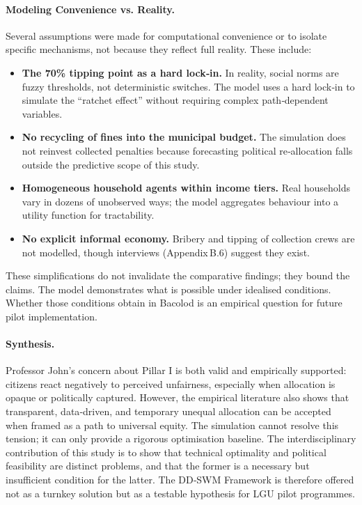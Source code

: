 \paragraph{Modeling Convenience vs. Reality.}
Several assumptions were made for computational convenience or to isolate specific mechanisms, not because they reflect full reality. These include:
\begin{itemize}
    \item \textbf{The 70\% tipping point as a hard lock‑in.} In reality, social norms are fuzzy thresholds, not deterministic switches. The model uses a hard lock‑in to simulate the “ratchet effect” without requiring complex path‑dependent variables.
    \item \textbf{No recycling of fines into the municipal budget.} The simulation does not reinvest collected penalties because forecasting political re‑allocation falls outside the predictive scope of this study.
    \item \textbf{Homogeneous household agents within income tiers.} Real households vary in dozens of unobserved ways; the model aggregates behaviour into a utility function for tractability.
    \item \textbf{No explicit informal economy.} Bribery and tipping of collection crews are not modelled, though interviews (Appendix B.6) suggest they exist.
\end{itemize}

These simplifications do not invalidate the comparative findings; they bound the claims. The model demonstrates what is possible under idealised conditions. Whether those conditions obtain in Bacolod is an empirical question for future pilot implementation.

\paragraph{Synthesis.}
Professor John’s concern about Pillar I is both valid and empirically supported: citizens react negatively to perceived unfairness, especially when allocation is opaque or politically captured. However, the empirical literature also shows that transparent, data‑driven, and temporary unequal allocation can be accepted when framed as a path to universal equity. The simulation cannot resolve this tension; it can only provide a rigorous optimisation baseline. The interdisciplinary contribution of this study is to show that technical optimality and political feasibility are distinct problems, and that the former is a necessary but insufficient condition for the latter. The DD‑SWM Framework is therefore offered not as a turnkey solution but as a testable hypothesis for LGU pilot programmes.

